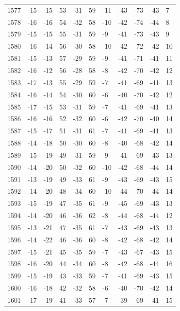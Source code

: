 \begin{table}[H]
\begin{tabular}{lllllllllll}
1577 & -15 & -15 & 53 & -31 & 59 & -11 & -43 & -73 & -43 & 7 \\
1578 & -16 & -16 & 54 & -32 & 58 & -10 & -42 & -74 & -44 & 8 \\
1579 & -15 & -15 & 55 & -31 & 59 & -9 & -41 & -73 & -43 & 9 \\
1580 & -16 & -14 & 56 & -30 & 58 & -10 & -42 & -72 & -42 & 10 \\
1581 & -15 & -13 & 57 & -29 & 59 & -9 & -41 & -71 & -41 & 11 \\
1582 & -16 & -12 & 56 & -28 & 58 & -8 & -42 & -70 & -42 & 12 \\
1583 & -17 & -13 & 55 & -29 & 59 & -7 & -41 & -69 & -41 & 13 \\
1584 & -16 & -14 & 54 & -30 & 60 & -6 & -40 & -70 & -42 & 12 \\
1585 & -17 & -15 & 53 & -31 & 59 & -7 & -41 & -69 & -41 & 13 \\
1586 & -16 & -16 & 52 & -32 & 60 & -6 & -42 & -70 & -40 & 14 \\
1587 & -15 & -17 & 51 & -31 & 61 & -7 & -41 & -69 & -41 & 13 \\
1588 & -14 & -18 & 50 & -30 & 60 & -8 & -40 & -68 & -42 & 14 \\
1589 & -15 & -19 & 49 & -31 & 59 & -9 & -41 & -69 & -43 & 13 \\
1590 & -14 & -20 & 50 & -32 & 60 & -10 & -42 & -68 & -44 & 14 \\
1591 & -13 & -19 & 49 & -33 & 61 & -9 & -43 & -69 & -43 & 15 \\
1592 & -14 & -20 & 48 & -34 & 60 & -10 & -44 & -70 & -44 & 14 \\
1593 & -15 & -19 & 47 & -35 & 61 & -9 & -45 & -69 & -43 & 13 \\
1594 & -14 & -20 & 46 & -36 & 62 & -8 & -44 & -68 & -44 & 12 \\
1595 & -13 & -21 & 47 & -35 & 61 & -7 & -43 & -69 & -43 & 13 \\
1596 & -14 & -22 & 46 & -36 & 60 & -8 & -42 & -68 & -42 & 14 \\
1597 & -15 & -21 & 45 & -35 & 59 & -7 & -43 & -67 & -43 & 15 \\
1598 & -16 & -20 & 44 & -34 & 60 & -8 & -42 & -68 & -44 & 16 \\
1599 & -15 & -19 & 43 & -33 & 59 & -7 & -41 & -69 & -43 & 15 \\
1600 & -16 & -18 & 42 & -32 & 58 & -6 & -40 & -70 & -42 & 14 \\
1601 & -17 & -19 & 41 & -33 & 57 & -7 & -39 & -69 & -41 & 15 \\

\end{tabular}
\end{table}
